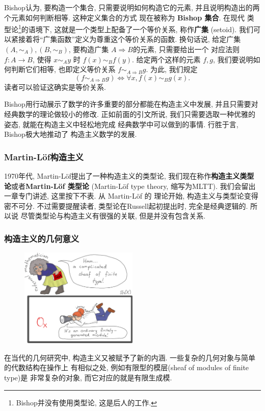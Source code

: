Bishop认为, 要构造一个集合, 只需要说明如何构造它的元素,
并且说明构造出的两个元素如何判断相等. 这种定义集合的方式
现在被称为 \textbf{Bishop 集合}. 在现代
类型论\footnote{Bishop并没有使用类型论, 这是后人的工作.}的语境下,
这就是一个类型上配备了一个等价关系, 称作\textbf{广集} (setoid).
我们可以紧接着将“广集函数”定义为尊重这个等价关系的函数.
换句话说, 给定广集 \((A, \sim_A),(B, \sim_B)\),
要构造广集 \(A \Rightarrow B\)的元素, 只需要给出一个
对应法则 \(f : A \to B\), 使得 \(x \sim_A y\) 时
\(f(x) \sim_B f(y)\). 给定两个这样的元素 \(f,g\),
我们要说明如何判断它们相等, 也即定义等价关系
\(f \sim_{A\Rightarrow B} g\). 为此, 我们规定
\[(f \sim_{A\Rightarrow B} g) \iff \forall x, f(x) \sim_B g(x).\]
读者可以验证这确实是等价关系.

Bishop用行动展示了数学的许多重要的部分都能在构造主义中发展,
并且只需要对经典数学的理论做较小的修改. 正如前面的引文所说,
我们只需要选取一种优雅的姿态, 就能在构造主义中轻松地完成
经典数学中可以做到的事情. 行胜于言, Bishop极大地推动了
构造主义数学的发展.

\subsubsection{Martin-L\"of构造主义}
1970年代, Martin-L\"of提出了一种构造主义的类型论,
我们现在称作\textbf{构造主义类型论}或者\textbf{Martin-L\"of 类型论}
(Martin-L\"of type theory, 缩写为MLTT).
我们会留出一章专门讲述, 这里按下不表. 从 Martin-L\"of 的
理论开始, 构造主义与类型论变得密不可分. 不过需要提醒读者,
类型论在Russell起初提出时, 完全是经典逻辑的. 所以说
尽管类型论与构造主义有很强的关联, 但是并没有包含关系.

\subsubsection{构造主义的几何意义}
\begin{figure}[ht]
\centering
\includegraphics[width=0.5\textwidth]{images/external-internal-small.png}
\end{figure}
在当代的几何研究中, 构造主义又被赋予了新的内涵.
一些复杂的几何对象与简单的代数结构在操作上
有相似之处, 例如有限型的模层(sheaf of modules of finite type)是
非常复杂的对象, 而它对应的就是有限生成模.

